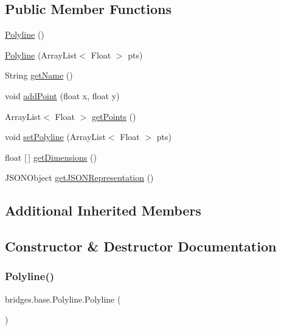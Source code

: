 \subsection*{Public Member Functions}
\begin{DoxyCompactItemize}
\item 
\mbox{\hyperlink{classbridges_1_1base_1_1_polyline_a8842a3d3737dfa5b26424a05dc965a4b}{Polyline}} ()
\item 
\mbox{\hyperlink{classbridges_1_1base_1_1_polyline_a11d14fddddd6e89e0902e94aa1bac875}{Polyline}} (Array\+List$<$ Float $>$ pts)
\item 
String \mbox{\hyperlink{classbridges_1_1base_1_1_polyline_a5b56cee642a6381ea940c75a336076ea}{get\+Name}} ()
\item 
void \mbox{\hyperlink{classbridges_1_1base_1_1_polyline_a24b99307181f1a938ea408355984d191}{add\+Point}} (float x, float y)
\item 
Array\+List$<$ Float $>$ \mbox{\hyperlink{classbridges_1_1base_1_1_polyline_ae610d680975558db90a06949991583f8}{get\+Points}} ()
\item 
void \mbox{\hyperlink{classbridges_1_1base_1_1_polyline_a3fec0c95e9f26b173cba105bd39e9df1}{set\+Polyline}} (Array\+List$<$ Float $>$ pts)
\item 
float \mbox{[}$\,$\mbox{]} \mbox{\hyperlink{classbridges_1_1base_1_1_polyline_a5665bd906b841ca71a668581aeb7a181}{get\+Dimensions}} ()
\item 
J\+S\+O\+N\+Object \mbox{\hyperlink{classbridges_1_1base_1_1_polyline_a4ac266909645f8db9b7fcc4836f6069a}{get\+J\+S\+O\+N\+Representation}} ()
\end{DoxyCompactItemize}
\subsection*{Additional Inherited Members}


\subsection{Constructor \& Destructor Documentation}
\mbox{\label{classbridges_1_1base_1_1_polyline_a8842a3d3737dfa5b26424a05dc965a4b}} 
\subsubsection{\texorpdfstring{Polyline()}{Polyline()}\hspace{0.1cm}{\footnotesize\ttfamily [1/2]}}
{\footnotesize\ttfamily bridges.\+base.\+Polyline.\+Polyline (\begin{DoxyParamCaption}{ }\end{DoxyParamCaption})}


